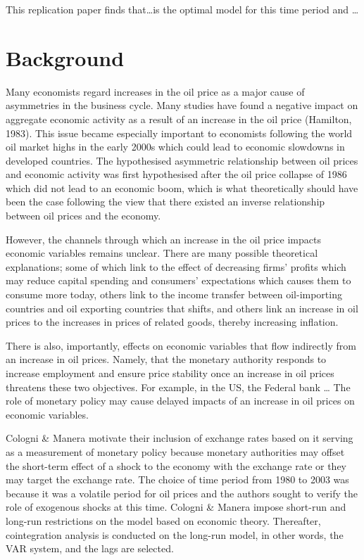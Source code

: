 \documentclass[11pt,preprint, authoryear]{elsarticle}
\numberwithin{equation}{section}
\numberwithin{figure}{section}
\numberwithin{table}{section}
\begin{document}
This replication paper finds that\ldots is the optimal model for this
time period and \ldots{}

\hypertarget{background}{%
\section{Background}\label{background}}

Many economists regard increases in the oil price as a major cause of
asymmetries in the business cycle. Many studies have found a negative
impact on aggregate economic activity as a result of an increase in the
oil price (Hamilton, 1983). This issue became especially important to
economists following the world oil market highs in the early 2000s which
could lead to economic slowdowns in developed countries. The
hypothesised asymmetric relationship between oil prices and economic
activity was first hypothesised after the oil price collapse of 1986
which did not lead to an economic boom, which is what theoretically
should have been the case following the view that there existed an
inverse relationship between oil prices and the economy.

However, the channels through which an increase in the oil price impacts
economic variables remains unclear. There are many possible theoretical
explanations; some of which link to the effect of decreasing firms'
profits which may reduce capital spending and consumers' expectations
which causes them to consume more today, others link to the income
transfer between oil-importing countries and oil exporting countries
that shifts, and others link an increase in oil prices to the increases
in prices of related goods, thereby increasing inflation.

There is also, importantly, effects on economic variables that flow
indirectly from an increase in oil prices. Namely, that the monetary
authority responds to increase employment and ensure price stability
once an increase in oil prices threatens these two objectives. For
example, in the US, the Federal bank \ldots{} The role of monetary
policy may cause delayed impacts of an increase in oil prices on
economic variables.

Cologni \& Manera motivate their inclusion of exchange rates based on it
serving as a measurement of monetary policy because monetary authorities
may offset the short-term effect of a shock to the economy with the
exchange rate or they may target the exchange rate. The choice of time
period from 1980 to 2003 was because it was a volatile period for oil
prices and the authors sought to verify the role of exogenous shocks at
this time. Cologni \& Manera impose short-run and long-run restrictions
on the model based on economic theory. Thereafter, cointegration
analysis is conducted on the long-run model, in other words, the VAR
system, and the lags are selected.
\end{document}
